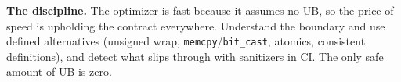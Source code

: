 \textbf{The discipline.} The optimizer is fast because it assumes no UB, so the price of speed is upholding the contract everywhere. Understand the boundary and use defined alternatives (unsigned wrap, \texttt{memcpy}/\texttt{bit\_cast}, atomics, consistent definitions), and detect what slips through with sanitizers in CI. The only safe amount of UB is zero.
